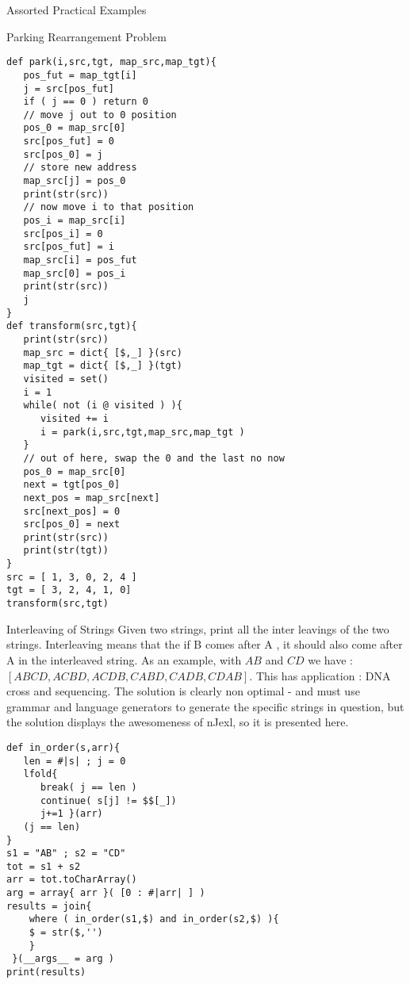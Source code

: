 \begin{section}{Assorted Practical Examples}
\begin{subsection}{Parking Rearrangement Problem}
\begin{center}\begin{minipage}{\linewidth}
\begin{lstlisting}[style=JexlStyle]
def park(i,src,tgt, map_src,map_tgt){
   pos_fut = map_tgt[i]
   j = src[pos_fut]
   if ( j == 0 ) return 0 
   // move j out to 0 position 
   pos_0 = map_src[0]
   src[pos_fut] = 0 
   src[pos_0] = j 
   // store new address 
   map_src[j] = pos_0 
   print(str(src))
   // now move i to that position
   pos_i = map_src[i]
   src[pos_i] = 0 
   src[pos_fut] = i 
   map_src[i] = pos_fut 
   map_src[0] = pos_i 
   print(str(src))
   j
}
def transform(src,tgt){
   print(str(src))
   map_src = dict{ [$,_] }(src)
   map_tgt = dict{ [$,_] }(tgt)
   visited = set()
   i = 1 
   while( not (i @ visited ) ){
      visited += i
      i = park(i,src,tgt,map_src,map_tgt )
   }
   // out of here, swap the 0 and the last no now 
   pos_0 = map_src[0]
   next = tgt[pos_0]
   next_pos = map_src[next]
   src[next_pos] = 0 
   src[pos_0] = next
   print(str(src))
   print(str(tgt))
}
src = [ 1, 3, 0, 2, 4 ]
tgt = [ 3, 2, 4, 1, 0]
transform(src,tgt)
\end{lstlisting}  
\end{minipage}\end{center}
\end{subsection}

\begin{subsection}{Interleaving of Strings}
Given two strings, print all the inter leavings of the two strings. 
Interleaving means that the if B comes after A , it should also come after A in the interleaved string. 
As an example, with $AB$ and $CD$ we have : $[ABCD , ACBD , ACDB, CABD, CADB, CDAB]$.
This has application : DNA cross and sequencing.
The solution is clearly non optimal - and must use grammar and language generators to generate 
the specific strings in question, but the solution displays the awesomeness of nJexl, 
so it is presented here.

\begin{center}\begin{minipage}{\linewidth}
\begin{lstlisting}[style=JexlStyle]
def in_order(s,arr){
   len = #|s| ; j = 0 
   lfold{
      break( j == len )
      continue( s[j] != $$[_])
      j+=1 }(arr)
   (j == len) 
}
s1 = "AB" ; s2 = "CD"
tot = s1 + s2 
arr = tot.toCharArray()
arg = array{ arr }( [0 : #|arr| ] )
results = join{
    where ( in_order(s1,$) and in_order(s2,$) ){
    $ = str($,'') 
    }
 }(__args__ = arg )
print(results)
\end{lstlisting}  
\end{minipage}\end{center}


\end{subsection}
\end{section}
